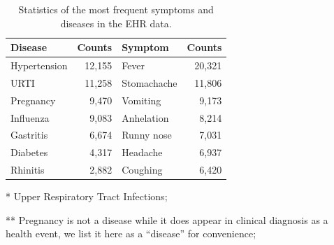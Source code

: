 \documentclass[sigconf]{acmart}
\begin{document}
\begin{table}[t]
  \centering
  \caption{Statistics of the most frequent symptoms and diseases in the EHR data. \label{tab:topsympdise}}
\begin{threeparttable}
    \begin{tabular}{|lr||lr|}
    \hline
    Disease & \multicolumn{1}{r||}{Counts} & Symptom & \multicolumn{1}{r|}{Counts} \\
    \hline
    Hypertension    & 12,155      & Fever     & 20,321 \\
    URTI \tnote{*}      & 11,258     & Stomachache     & 11,806 \\
    Pregnancy \tnote{**}     & 9,470     & Vomiting     & 9,173 \\
    Influenza  & 9,083     & Anhelation     & 8,214 \\
    Gastritis   & 6,674     & Runny nose     & 7,031 \\
    Diabetes     & 4,317     & Headache     & 6,937 \\
    Rhinitis  & 2,882     & Coughing     & 6,420 \\
    \hline
    \end{tabular}%
\begin{tablenotes}
\footnotesize
\item[*] Upper Respiratory Tract Infections;
\item[**] Pregnancy is not a disease while it does appear in clinical diagnosis as a health event, we list it here as a ``disease'' for convenience;
\end{tablenotes}
\end{threeparttable}
\end{table}%
\end{document}
